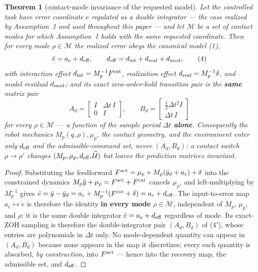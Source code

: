 \documentclass[journal]{IEEEtran}
\theoremstyle{plain}
\newtheorem{theorem}{Theorem}
\theoremstyle{definition}
\theoremstyle{remark}
\newcommand{\deff}{d_{\rm eff}}
\begin{document}
\begin{theorem}[contact-mode invariance of the requested model]
Let the controlled task have error coordinate $e$ regulated as a double integrator --- the case realized by Assumption~1 and used throughout this paper --- and let $\mathcal M$ be a set of contact modes for which Assumption~1 holds with the \emph{same} requested coordinate. Then for every mode $\rho\in\mathcal M$ the realized error obeys the canonical model (1),
\begin{equation}
\ddot e=a_e+\deff,\qquad
\deff=d_{\rm int}+d_{\rm real}+d_{\rm mod},
\tag{4}
\end{equation}
with interaction effect $d_{\rm int}=M_p^{-1}F^{\rm ext}$, realization effect $d_{\rm real}=M_p^{-1}\delta$, and model residual $d_{\rm mod}$; and its exact zero-order-hold transition pair is the \textbf{same} matrix pair
\begin{equation}
A_d=\begin{bmatrix}I&\Delta t\,I\\0&I\end{bmatrix},\qquad
B_d=\begin{bmatrix}\tfrac12\Delta t^2I\\\Delta t\,I\end{bmatrix}
\tag{4$'$}
\end{equation}
for every $\rho\in\mathcal M$ --- a function of the sample period $\Delta t$ \textbf{alone}. Consequently the robot mechanics $M_p(q,\rho),\mu_p$, the contact geometry, and the environment enter only $\deff$ and the admissible-command set, never $(A_d,B_d)$: a contact switch $\rho\to\rho'$ changes $(M_p,\mu_p,\deff,\widehat{\mathcal U})$ but leaves the prediction matrices invariant.
\end{theorem}

\begin{proof}
Substituting the feedforward $F^{\rm act}=\mu_p+M_p(\ddot y_d+a_e)+\delta$ into the constrained dynamics $M_p\ddot y+\mu_p=F^{\rm act}+F^{\rm ext}$ cancels $\mu_p$, and left-multiplying by $M_p^{-1}$ gives $\ddot e=\ddot y-\ddot y_d=a_e+M_p^{-1}(F^{\rm ext}+\delta)=a_e+\deff$. The input-to-error map $a_e\mapsto\ddot e$ is therefore the identity \textbf{in every mode $\rho\in\mathcal M$}, independent of $M_p$, $\mu_p$, and $\rho$: it is the same double integrator $\ddot e=a_e+\deff$ regardless of mode. Its exact-ZOH sampling is therefore the double-integrator pair $(A_d,B_d)$ of (4$'$), whose entries are polynomials in $\Delta t$ only. No mode-dependent quantity can appear in $(A_d,B_d)$ because none appears in the map it discretizes; every such quantity is absorbed, \emph{by construction}, into $F^{\rm act}$ --- hence into the recovery map, the admissible set, and $\deff$.
\end{proof}
\end{document}
